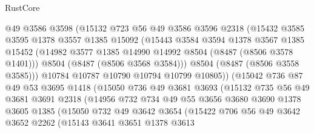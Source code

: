 \begin{lexlean}{RustCore}
\begin{coremodule}
                    @49
                    @3586
                    @3598
                    (@15132
                      @723
                      @56
                      @49
                      @3586
                      @3596
                      @2318
                      (@15432
                        @3585
                        @3595
                        @1378
                        @3557
                        @1385
                        @15092
                        (@15443
                          @3584
                          @3594
                          @1378
                          @3567
                          @1385
                          @15452
                          (@14982 @3577 @1385 @14990 @14992 @8504 (@8487 (@8506 @3578 @1401)))
                          @8504
                          (@8487 (@8506 @3568 @3584)))
                        @8504
                        (@8487 (@8506 @3558 @3585)))
                      @10784
                      @10787
                      @10790
                      @10794
                      @10799
                      @10805))
                  (@15042
                    @736
                    @87
                    @49
                    @53
                    @3695
                    @1418
                    (@15050
                      @736
                      @49
                      @3681
                      @3693
                      (@15132
                        @735
                        @56
                        @49
                        @3681
                        @3691
                        @2318
                        (@14956
                          @732
                          @734
                          @49
                          @55
                          @3656
                          @3680
                          @3690
                          @1378
                          @3605
                          @1385
                          (@15050
                            @732
                            @49
                            @3642
                            @3654
                            (@15422
                              @706
                              @56
                              @49
                              @3642
                              @3652
                              @2262
                              (@15143
                                @3641
                                @3651
                                @1378
                                @3613

\end{coremodule}
\end{lexlean}
